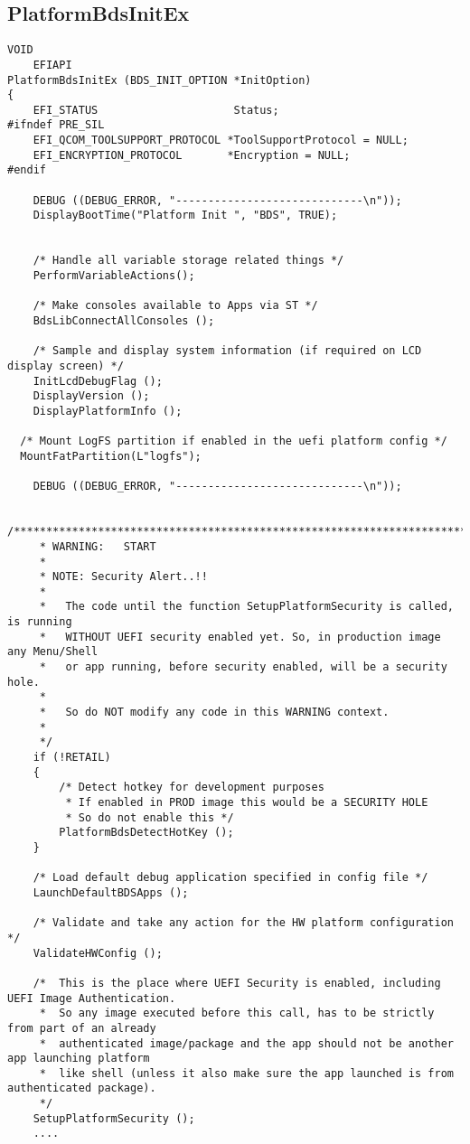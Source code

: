 \subsection{PlatformBdsInitEx}
\begin{lstlisting}
VOID
	EFIAPI
PlatformBdsInitEx (BDS_INIT_OPTION *InitOption)
{
	EFI_STATUS                     Status;
#ifndef PRE_SIL
	EFI_QCOM_TOOLSUPPORT_PROTOCOL *ToolSupportProtocol = NULL;
	EFI_ENCRYPTION_PROTOCOL       *Encryption = NULL;
#endif

	DEBUG ((DEBUG_ERROR, "-----------------------------\n"));
	DisplayBootTime("Platform Init ", "BDS", TRUE);


	/* Handle all variable storage related things */
	PerformVariableActions();

	/* Make consoles available to Apps via ST */
	BdsLibConnectAllConsoles ();

	/* Sample and display system information (if required on LCD display screen) */
	InitLcdDebugFlag ();
	DisplayVersion ();
	DisplayPlatformInfo ();

  /* Mount LogFS partition if enabled in the uefi platform config */
  MountFatPartition(L"logfs");

	DEBUG ((DEBUG_ERROR, "-----------------------------\n"));

	/************************************************************************************
	 * WARNING:   START
	 *
	 * NOTE: Security Alert..!!
	 *
	 *   The code until the function SetupPlatformSecurity is called, is running 
	 *   WITHOUT UEFI security enabled yet. So, in production image any Menu/Shell
	 *   or app running, before security enabled, will be a security hole.
	 *
	 *   So do NOT modify any code in this WARNING context.
	 *
	 */
	if (!RETAIL)
	{
		/* Detect hotkey for development purposes
		 * If enabled in PROD image this would be a SECURITY HOLE
		 * So do not enable this */
		PlatformBdsDetectHotKey ();
	}

	/* Load default debug application specified in config file */
	LaunchDefaultBDSApps ();

	/* Validate and take any action for the HW platform configuration */
	ValidateHWConfig ();

	/*  This is the place where UEFI Security is enabled, including UEFI Image Authentication.
	 *  So any image executed before this call, has to be strictly from part of an already
	 *  authenticated image/package and the app should not be another app launching platform
	 *  like shell (unless it also make sure the app launched is from authenticated package).
	 */
	SetupPlatformSecurity ();
    ....
\end{lstlisting}


